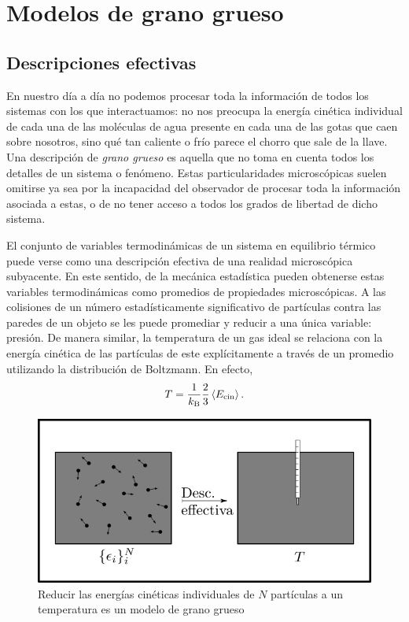 \section{Modelos de grano grueso}
\label{sec:ch2_cg}

\subsection{Descripciones efectivas}



En nuestro día a día no podemos procesar toda la información de todos los sistemas con los que interactuamos: no nos preocupa la energía cinética individual de cada una de las moléculas de agua presente en cada una de las gotas que caen sobre nosotros, sino qué tan caliente o frío parece el chorro que sale de la llave. Una descripción de \textit{grano grueso} es aquella que no toma en cuenta todos los detalles de un sistema o fenómeno. Estas particularidades microscópicas suelen omitirse ya sea por la incapacidad del observador de procesar toda la información asociada a estas, o de no tener acceso a todos los grados de libertad de dicho sistema.

El conjunto de variables termodinámicas de un sistema en equilibrio térmico puede verse como una descripción efectiva de una realidad microscópica subyacente. En este sentido, de la mecánica estadística pueden obtenerse estas variables termodinámicas como promedios de propiedades microscópicas. A las colisiones de un número estadísticamente significativo de partículas contra las paredes de un objeto se les puede promediar y reducir a una única variable: presión. De manera similar, la temperatura de un gas ideal se relaciona con la energía cinética de las partículas de este explícitamente a través de un promedio utilizando la distribución de Boltzmann. En efecto, 
\begin{equation}
    T=\frac{1}{k_\text{B}}\frac{2}{3}\expval{E_{\text{cin}}}.\nonumber
\end{equation}
\begin{figure}[ht]
    \centering
    \includegraphics[width=0.6\linewidth]{chapter2/figures/CGT.png}
    \caption{Reducir las energías cinéticas individuales de $N$ partículas a un temperatura es un modelo de grano grueso}
    \label{fig:ch2_KtoT}
\end{figure}

